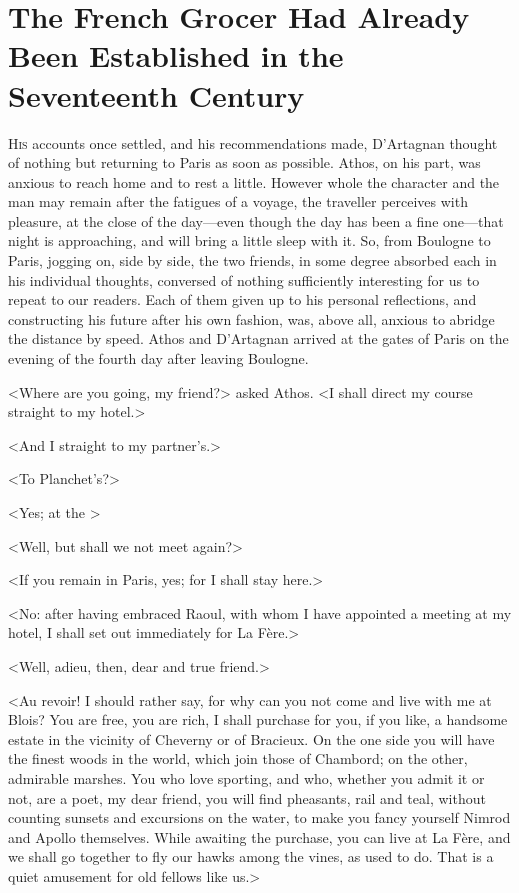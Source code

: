 \chapter[The French Grocer in the Seventeenth Century]{The French Grocer Had Already Been Established in the Seventeenth Century}
	


\lettrine{H}{is} accounts once settled, and his recommendations made, D'Artagnan thought of nothing but returning to Paris as soon as possible. Athos, on his part, was anxious to reach home and to rest a little. However whole the character and the man may remain after the fatigues of a voyage, the traveller perceives with pleasure, at the close of the day—even though the day has been a fine one—that night is approaching, and will bring a little sleep with it. So, from Boulogne to Paris, jogging on, side by side, the two friends, in some degree absorbed each in his individual thoughts, conversed of nothing sufficiently interesting for us to repeat to our readers. Each of them given up to his personal reflections, and constructing his future after his own fashion, was, above all, anxious to abridge the distance by speed. Athos and D'Artagnan arrived at the gates of Paris on the evening of the fourth day after leaving Boulogne.

<Where are you going, my friend?> asked Athos. <I shall direct my course straight to my hotel.>

<And I straight to my partner's.>

<To Planchet's?>

<Yes; at the >

<Well, but shall we not meet again?>

<If you remain in Paris, yes; for I shall stay here.>

<No: after having embraced Raoul, with whom I have appointed a meeting at my hotel, I shall set out immediately for La Fère.>

<Well, adieu, then, dear and true friend.>

<Au revoir! I should rather say, for why can you not come and live with me at Blois? You are free, you are rich, I shall purchase for you, if you like, a handsome estate in the vicinity of Cheverny or of Bracieux. On the one side you will have the finest woods in the world, which join those of Chambord; on the other, admirable marshes. You who love sporting, and who, whether you admit it or not, are a poet, my dear friend, you will find pheasants, rail and teal, without counting sunsets and excursions on the water, to make you fancy yourself Nimrod and Apollo themselves. While awaiting the purchase, you can live at La Fère, and we shall go together to fly our hawks among the vines, as  used to do. That is a quiet amusement for old fellows like us.>

